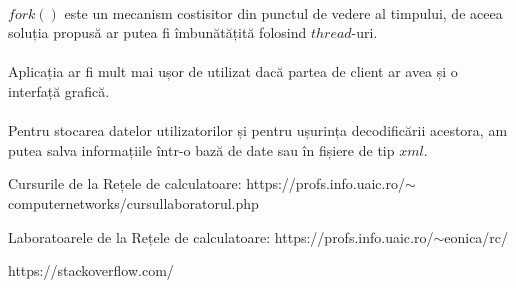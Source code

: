 \documentclass[runningheads]{llncs}
\begin{document}
\paragraph{}
$fork()$ este un mecanism costisitor din punctul de vedere al timpului, de aceea soluția propusă ar putea fi îmbunătățită folosind 
$thread$-uri.
\vspace{-4mm}
\paragraph{}
Aplicația ar fi mult mai ușor de utilizat dacă partea de client ar avea și o interfață grafică.
\vspace{-4mm}
\paragraph{}
Pentru stocarea datelor utilizatorilor și pentru ușurința decodificării acestora, am putea salva informațiile într-o bază de date sau în fișiere de tip $xml$.




\begin{thebibliography}{}

\bibitem{}
Cursurile de la Rețele de calculatoare: 
https://profs.info.uaic.ro/$\sim$computernetworks/cursullaboratorul.php

\bibitem{}
Laboratoarele de la Rețele de calculatoare:
https://profs.info.uaic.ro/$\sim$eonica/rc/

\bibitem{}
https://stackoverflow.com/

\end{thebibliography}
\end{document}

